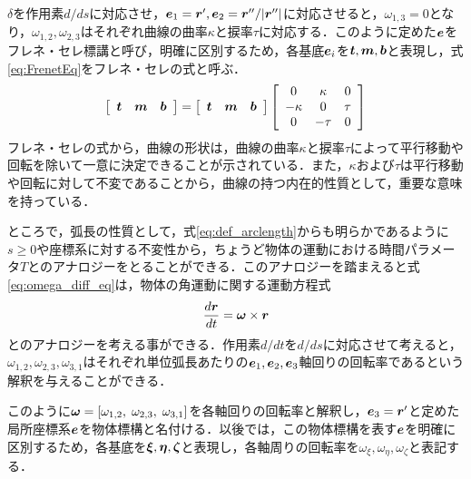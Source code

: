  	$ \delta $を作用素$ d/ds $に対応させ，$ \boldsymbol{e}_1 = \boldsymbol{r}', \boldsymbol{e}_2 = \boldsymbol{r}''/|\boldsymbol{r}''|$に対応させると，$ \omega_{1,3} = 0$となり，$ \omega_{1,2},\omega_{2,3} $はそれぞれ曲線の曲率$ \kappa $と捩率$ \tau $に対応する．このように定めた$ \boldsymbol{e} $をフレネ・セレ標講と呼び，明確に区別するため，各基底$ \boldsymbol{e}_i $を$ \boldsymbol{t},\boldsymbol{m},\boldsymbol{b} $と表現し，式\ref{eq:FrenetEq}をフレネ・セレの式と呼ぶ．
 	\begin{equation}\label{eq:FrenetEq}
 		\left[ \begin{array}{ccc}
 			\boldsymbol{t} & \boldsymbol{m} & \boldsymbol{b} 
 		\end{array}\right] = \left[ \begin{array}{ccc}
 		\boldsymbol{t} & \boldsymbol{m} & \boldsymbol{b} 
 	\end{array}\right] \left[
 	\begin{array}{ccc}
 		0 & \kappa & 0 \\
 		-\kappa & 0 & \tau \\
 		0 & -\tau & 0 
 	\end{array}
 \right]
 	\end{equation}
 	フレネ・セレの式から，曲線の形状は，曲線の曲率$ \kappa $と捩率$ \tau $によって平行移動や回転を除いて一意に決定できることが示されている．また，$ \kappa $および$ \tau $は平行移動や回転に対して不変であることから，曲線の持つ内在的性質として，重要な意味を持っている．
 	
 	ところで，弧長の性質として，式\ref{eq:def_arclength}からも明らかであるように$ s \geq 0 $や座標系に対する不変性から，ちょうど物体の運動における時間パラメータ$ T $とのアナロジーをとることができる．このアナロジーを踏まえると式\ref{eq:omega_diff_eq}は，物体の角運動に関する運動方程式
 	\begin{equation}\label{eq:RotateEq}
 		\frac{d\boldsymbol{r}}{dt} =  \boldsymbol{\omega} \times \boldsymbol{r} 
 	\end{equation}
 	とのアナロジーを考える事ができる．作用素$ d/dt $を$ d/ds $に対応させて考えると，$ \omega_{1,2}, \omega_{2,3},\omega_{3,1} $はそれぞれ単位弧長あたりの$ \boldsymbol{e}_1,\boldsymbol{e}_2,\boldsymbol{e}_3 $軸回りの回転率であるという解釈を与えることができる．
 	
 	このように$ \boldsymbol{\omega} = [\omega_{1,2},\; \omega_{2,3},\; \omega_{3,1}] $を各軸回りの回転率と解釈し，$ \boldsymbol{e}_3 = \boldsymbol{r}'$と定めた局所座標系$ \boldsymbol{e}$を物体標構と名付ける．以後では，この物体標構を表す$ \boldsymbol{e} $を明確に区別するため，各基底を$ \boldsymbol{\xi},\boldsymbol{\eta},\boldsymbol{\zeta} $と表現し，各軸周りの回転率を$ \omega_{\xi},\omega_{\eta},\omega_{\zeta} $と表記する．
 	
